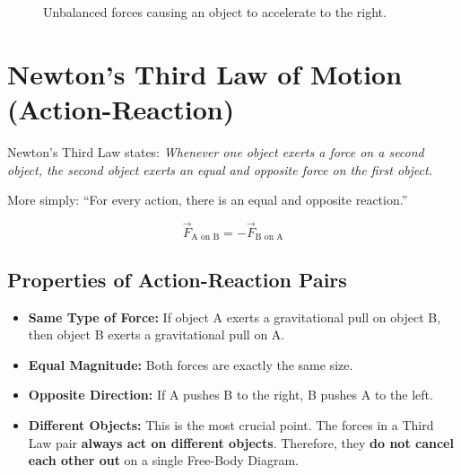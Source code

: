 \documentclass{article}
\begin{document}
\begin{figure}[h]
    \centering
    \caption{Unbalanced forces causing an object to accelerate to the right.}
\end{figure}

\newpage

\section{Newton's Third Law of Motion (Action-Reaction)}

Newton's Third Law states: \emph{Whenever one object exerts a force on a second object, the second object exerts an equal and opposite force on the first object.}

More simply: ``For every action, there is an equal and opposite reaction.''

\begin{equation}
\vec{F}_{\text{A on B}} = -\vec{F}_{\text{B on A}}
\end{equation}

\subsection{Properties of Action-Reaction Pairs}
\begin{itemize}
    \item \textbf{Same Type of Force:} If object A exerts a gravitational pull on object B, then object B exerts a gravitational pull on A.
    \item \textbf{Equal Magnitude:} Both forces are exactly the same size.
    \item \textbf{Opposite Direction:} If A pushes B to the right, B pushes A to the left.
    \item \textbf{Different Objects:} This is the most crucial point. The forces in a Third Law pair \textbf{always act on different objects}. Therefore, they \textbf{do not cancel each other out} on a single Free-Body Diagram.
\end{itemize}
\end{document}
